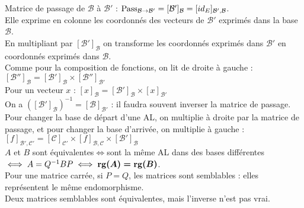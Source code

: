 	Matrice de passage de $\mathcal{B}$ à $\mathcal{B}'$ : $\textrm{Pass}_{\mathcal{B} \rightarrow \mathcal{B}'} = [\mathcal{B}']_\mathcal{B} =  [id_E]_{\mathcal{B}',\mathcal{B}}$.\\
	Elle exprime en colonne les coordonnés des vecteurs de $\mathcal{B}'$ exprimés dans la base $\mathcal{B}$.\\

	En multipliant par $[\mathcal{B}']_\mathcal{B}$ on transforme les coordonnés exprimés dans $\mathcal{B}'$ en coordonnés exprimés dans $\mathcal{B}$.\\
	Comme pour la composition de fonctions, on lit de droite à gauche : $[\mathcal{B''}]_{\mathcal{B}} = [\mathcal{B'}]_{\mathcal{B}} \times [\mathcal{B}'']_{\mathcal{B}'}$\\
	Pour un vecteur $x$ : $[x]_{\mathcal{B}} = [\mathcal{B'}]_\mathcal{B} \times [x]_{\mathcal{B}'}$
	\vspace{5pt}\\
	On a $([\mathcal{B}']_\mathcal{B})^{-1} = [\mathcal{B}]_{\mathcal{B}'}$ : il faudra souvent inverser la matrice de passage.
	\vspace{5pt}\\
	Pour changer la base de départ d'une AL, on multiplie à droite par la matrice de passage, et pour changer la base d'arrivée, on multiplie à gauche : $[f]_{\mathcal{B}',\mathcal{C}'} = [\mathcal{C}]_{\mathcal{C'}} \times [f]_{\mathcal{B},\mathcal{C}} \times [\mathcal{B'}]_{\mathcal{B}}$\\

	$A$ et $B$ sont équivalentes$\iff$sont la même AL dans des bases différentes$\iff A = Q^{-1} B P \iff \boldsymbol{\operatorname{rg}(A) = \operatorname{rg}(B)}$.\\
	Pour une matrice carrée, si $P = Q$, les matrices sont semblables : elles représentent le même endomorphisme.\\

	Deux matrices semblables sont équivalentes, mais l'inverse n'est pas vrai.

